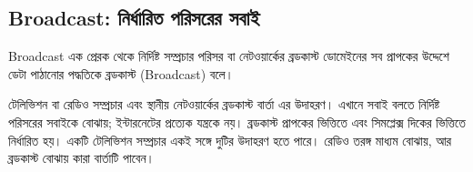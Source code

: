 \subsection{Broadcast: নির্ধারিত পরিসরের সবাই}
\label{ch2:c02-12}
\begin{definitionbox}{Broadcast}
এক প্রেরক থেকে নির্দিষ্ট সম্প্রচার পরিসর বা নেটওয়ার্কের ব্রডকাস্ট ডোমেইনের সব প্রাপকের উদ্দেশে ডেটা পাঠানোর পদ্ধতিকে ব্রডকাস্ট (Broadcast) বলে।
\end{definitionbox}
টেলিভিশন বা রেডিও সম্প্রচার এবং স্থানীয় নেটওয়ার্কের ব্রডকাস্ট বার্তা এর উদাহরণ। এখানে সবাই বলতে নির্দিষ্ট পরিসরের সবাইকে বোঝায়; ইন্টারনেটের প্রত্যেক যন্ত্রকে নয়। ব্রডকাস্ট প্রাপকের ভিত্তিতে এবং সিমপ্লেক্স দিকের ভিত্তিতে নির্ধারিত হয়। একটি টেলিভিশন সম্প্রচার একই সঙ্গে দুটির উদাহরণ হতে পারে। রেডিও তরঙ্গ মাধ্যম বোঝায়, আর ব্রডকাস্ট বোঝায় কারা বার্তাটি পাবেন।

